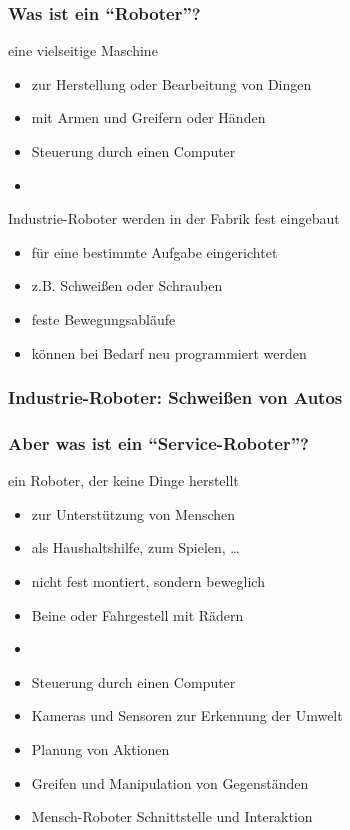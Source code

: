 \documentclass[t]{beamer}
\def\ii{\item[]}
\begin{document}
\begin{frame}
\frametitle{Was ist ein "`Roboter"'?}
eine vielseitige Maschine 
\begin{itemize}
\item zur Herstellung oder Bearbeitung von Dingen
\item mit Armen und Greifern oder Händen
\item Steuerung durch einen Computer
\ii
\end{itemize}
Industrie-Roboter werden in der Fabrik fest eingebaut
\begin{itemize}
\item für eine bestimmte Aufgabe eingerichtet
\item z.B. Schweißen oder Schrauben
\item feste Bewegungsabläufe
\item können bei Bedarf neu programmiert werden
\end{itemize}
\end{frame}


\begin{frame}
\frametitle{Industrie-Roboter: Schweißen von Autos}
\end{frame}




\begin{frame}
\frametitle{Aber was ist ein "`Service-Roboter"'?}
ein Roboter, der keine Dinge herstellt
\begin{itemize}
\item zur Unterstützung von Menschen
\item als Haushaltshilfe, zum Spielen, \dots
\item nicht fest montiert, sondern beweglich
\item Beine oder Fahrgestell mit Rädern
\item[]
\item Steuerung durch einen Computer
\item Kameras und Sensoren zur Erkennung der Umwelt
\item Planung von Aktionen
\item Greifen und Manipulation von Gegenständen
\item Mensch-Roboter Schnittstelle und Interaktion
\end{itemize}
\end{frame}
\end{document}

